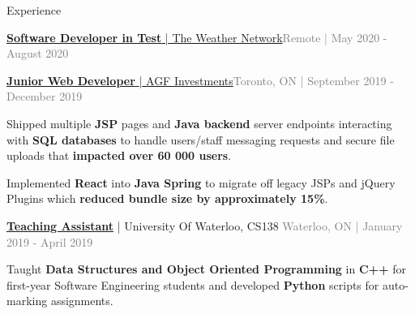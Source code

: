\documentclass[hidelinks]{resume} %
\begin{document}
\begin{rSection}{Experience}
\begin{rSubsection}{\href{https://www.theweathernetwork.com/}{\textbf{Software Developer in Test}{ | The Weather Network}}}{\textcolor{gray}{Remote | May 2020 - August 2020}}{}
\begin{bulletpoints}
             \vspace{-.25cm}
        \end{bulletpoints}
\end{rSubsection}
\begin{rSubsection}{\href{https://www.agf.com/ca/en/index.jsp}{\textbf{Junior Web Developer} {| AGF Investments}}}{\textcolor{gray}{Toronto, ON | September 2019 - December 2019}}{}
        \par
        \begin{bulletpoints}
            \vspace{-.10cm}
            \item Shipped multiple \textbf{JSP} pages and \textbf{Java backend} server endpoints interacting with \textbf{SQL databases} to handle users/staff messaging requests and secure file uploads that \textbf{impacted over 60 000 users}.
            \vspace{-.13cm}
             \item Implemented \textbf{React} into \textbf{Java Spring} to migrate off legacy JSPs and jQuery Plugins which \textbf{reduced bundle size by approximately 15\%}.
             \vspace{-.25cm}
        \end{bulletpoints}
\end{rSubsection}
\begin{rSubsection}{\href{https://student.cs.uwaterloo.ca/~cs138/outline.shtml}{\textbf{Teaching Assistant}}{ | University Of Waterloo, CS138 }}{\textcolor{gray}{Waterloo, ON | January 2019 - April 2019}}{}

    \begin{bulletpoints}
        \vspace{-.10cm}
        \item Taught \textbf{Data Structures and Object Oriented Programming} in \textbf{C++} for first-year Software Engineering students and developed \textbf{Python} scripts for auto-marking assignments.
        \vspace{-.25cm}
    \end{bulletpoints}   

\end{rSubsection}

\end{rSection}

\vspace{-.05cm}
\end{document}
